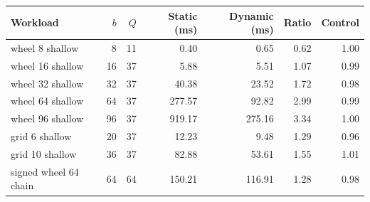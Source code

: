 \begin{tabular}{lrrrrrr}
\toprule
Workload & $b$ & $Q$ & Static (ms) & Dynamic (ms) & Ratio & Control\\
\midrule
wheel 8 shallow & 8 & 11 & 0.40 & 0.65 & 0.62 & 1.00\\
wheel 16 shallow & 16 & 37 & 5.88 & 5.51 & 1.07 & 0.99\\
wheel 32 shallow & 32 & 37 & 40.38 & 23.52 & 1.72 & 0.98\\
wheel 64 shallow & 64 & 37 & 277.57 & 92.82 & 2.99 & 0.99\\
wheel 96 shallow & 96 & 37 & 919.17 & 275.16 & 3.34 & 1.00\\
grid 6 shallow & 20 & 37 & 12.23 & 9.48 & 1.29 & 0.96\\
grid 10 shallow & 36 & 37 & 82.88 & 53.61 & 1.55 & 1.01\\
signed wheel 64 chain & 64 & 64 & 150.21 & 116.91 & 1.28 & 0.98\\
\bottomrule
\end{tabular}
